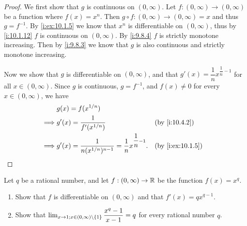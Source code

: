 \begin{proof}
  We first show that \(g\) is continuous on \((0, \infty)\).
  Let \(f : (0, \infty) \to (0, \infty)\) be a function where \(f(x) = x^n\).
  Then \(g \circ f : (0, \infty) \to (0, \infty) = x\) and thus \(g = f^{-1}\).
  By \cref{i:ex:10.1.5} we know that \(x^n\) is differentiable on \((0, \infty)\), thus by \cref{i:10.1.12} \(f\) is continuous on \((0, \infty)\).
  By \cref{i:9.8.4} \(f\) is strictly monotone increasing.
  Then by \cref{i:9.8.3} we know that \(g\) is also continuous and strictly monotone increasing.

  Now we show that \(g\) is differentiable on \((0, \infty)\), and that \(g'(x) = \dfrac{1}{n} x^{\dfrac{1}{n} - 1}\) for all \(x \in (0, \infty)\).
  Since \(g\) is continuous, \(g = f^{-1}\), and \(f(x) \neq 0\) for every \(x \in (0, \infty)\), we have
  \begin{align*}
             & g(x) = f(x^{1 / n})                                                                                 \\
    \implies & g'(x) = \dfrac{1}{f'(x^{1 / n})}                                              &  & \by{i:10.4.2}    \\
    \implies & g'(x) = \dfrac{1}{n (x^{1 / n})^{n - 1}} = \dfrac{1}{n} x^{\dfrac{1}{n} - 1}. &  & \by{i:ex:10.1.5}
  \end{align*}
\end{proof}

\begin{ex}\label{i:ex:10.4.2}
  Let \(q\) be a rational number, and let \(f : (0, \infty) \to \mathbb{R}\) be the function \(f(x) = x^q\).
  \begin{enumerate}
    \item Show that \(f\) is differentiable on \((0, \infty)\) and that \(f'(x) = q x^{q - 1}\).
    \item Show that \(\lim_{x \to 1 ; x \in (0, \infty) \setminus \left\lbrace1\right\rbrace} \dfrac{x^q - 1}{x - 1} = q\) for every rational number \(q\).
  \end{enumerate}
\end{ex}

